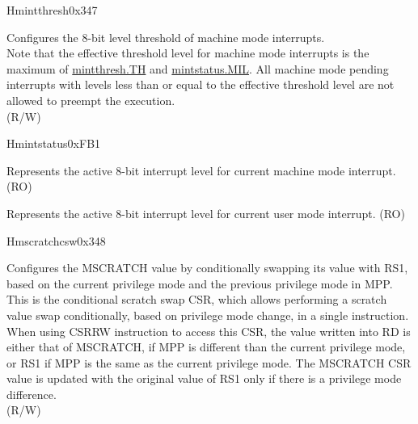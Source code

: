 \begin{register}{H}{mintthresh}{0x347}\label{regdesc:MINTTHRESH}
%
%
\regnewline%
\begin{regdesc}\begin{reglist}
\label{fielddesc:MINTTHRESH_TH}\item [TH] Configures the 8-bit level threshold of machine mode interrupts. \\
Note that the effective threshold level for machine mode interrupts is the maximum of \hyperref[fielddesc:MINTTHRESH_TH]{{mintthresh.TH}} and \hyperref[fielddesc:MINTSTATUS_MIL]{{mintstatus.MIL}}. All machine mode pending interrupts with levels less than or equal to the effective threshold level are not allowed to preempt the execution.\\
(R/W)
\end{reglist}\end{regdesc}
\end{register}


\begin{register}{H}{mintstatus}{0xFB1}
\label{regdesc:MINTSTATUS}
%
%
%
\regnewline%
\begin{regdesc}\begin{reglist}
\label{fielddesc:MINTSTATUS_MIL}\item [MIL] Represents the active 8-bit interrupt level for current machine mode interrupt. (RO)
\label{fielddesc:MINTSTATUS_UIL}\item [UIL] Represents the active 8-bit interrupt level for current user mode interrupt.  (RO)
\end{reglist}\end{regdesc}
\end{register}


\begin{register}{H}{mscratchcsw}{0x348}\label{regdesc:MSCRATCHCSW_REG}
%
\regnewline%
\begin{regdesc}\begin{reglist}
\label{fielddesc:MSCRATCHCSW}\item [MSCRATCHCSW] Configures the MSCRATCH value by conditionally swapping its value with RS1, based on the current privilege mode and the previous privilege mode in MPP.\\
This is the conditional scratch swap CSR, which allows performing a scratch value swap conditionally, based on privilege mode change, in a single instruction.\\
When using CSRRW instruction to access this CSR, the value written into RD is either that of MSCRATCH, if MPP is different than the current privilege mode, or RS1 if MPP is the same as the current privilege mode. The MSCRATCH CSR value is updated with the original value of RS1 only if there is a privilege mode difference. \\
(R/W)
\end{reglist}\end{regdesc}
\end{register}

